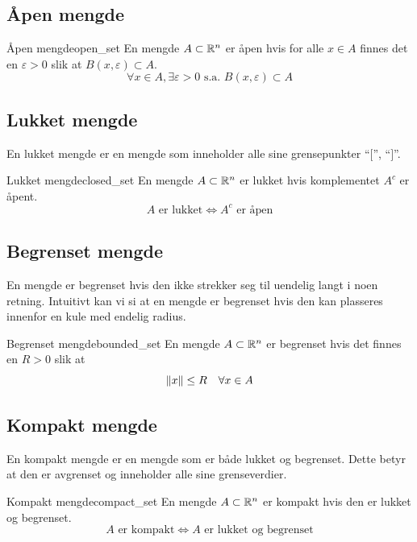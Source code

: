 \subsection{Åpen mengde}

\begin{definition}{Åpen mengde}{open_set}
	En mengde \(A \subset \mathbb{R}^n\) er åpen hvis for alle \(x \in A\) finnes det en \(\varepsilon > 0\) slik at \(B(x, \varepsilon) \subset A\).
	\[
		\forall x \in A, \exists \varepsilon > 0 \text{ s.a. } B(x, \varepsilon) \subset A
	\]
\end{definition}

\subsection{Lukket mengde}
En lukket mengde er en mengde som inneholder alle sine grensepunkter \enquote{$[$}, \enquote{$]$}.
\begin{definition}{Lukket mengde}{closed_set}
	En mengde \(A \subset \mathbb{R}^n\) er lukket hvis komplementet \(A^c\) er åpent.
	\[
		A \text{ er lukket} \Leftrightarrow A^c \text{ er åpen}
	\]
\end{definition}

\subsection{Begrenset mengde}

En mengde er begrenset hvis den ikke strekker seg til uendelig langt i noen retning.
Intuitivt kan vi si at en mengde er begrenset hvis den kan plasseres innenfor en kule med endelig radius.

\begin{definition}{Begrenset mengde}{bounded_set}
	En mengde \(A \subset \mathbb{R}^n\) er begrenset hvis det finnes en \(R > 0\) slik at
	\[
		\lVert x\rVert \leq R \quad \forall x \in A
	\]
\end{definition}

\subsection{Kompakt mengde}

En kompakt mengde er en mengde som er både lukket og begrenset. Dette betyr at den er avgrenset og inneholder alle sine grenseverdier.

\begin{definition}{Kompakt mengde}{compact_set}
	En mengde \(A \subset \mathbb{R}^n\) er kompakt hvis den er lukket og begrenset.
	\[
		A \text{ er kompakt} \Leftrightarrow A \text{ er lukket og begrenset}
	\]
\end{definition}

